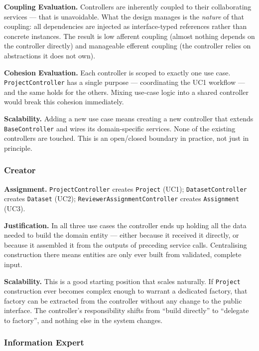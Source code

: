 \documentclass[12pt,a4paper]{article}
\newcommand{\code}[1]{\texttt{\small #1}}
\begin{document}
\noindent\textbf{Coupling Evaluation.}
Controllers are inherently coupled to their collaborating services --- that is unavoidable. What the design manages is the \textit{nature} of that coupling: all dependencies are injected as interface-typed references rather than concrete instances. The result is low afferent coupling (almost nothing depends on the controller directly) and manageable efferent coupling (the controller relies on abstractions it does not own).

\noindent\textbf{Cohesion Evaluation.}
Each controller is scoped to exactly one use case. \code{ProjectController} has a single purpose --- coordinating the UC1 workflow --- and the same holds for the others. Mixing use-case logic into a shared controller would break this cohesion immediately.

\noindent\textbf{Scalability.}
Adding a new use case means creating a new controller that extends \code{BaseController} and wires its domain-specific services. None of the existing controllers are touched. This is an open/closed boundary in practice, not just in principle.

\subsubsection{Creator}

\noindent\textbf{Assignment.}
\code{ProjectController} creates \code{Project} (UC1); \code{DatasetController} creates \code{Dataset} (UC2); \code{ReviewerAssignmentController} creates \code{Assignment} (UC3).

\noindent\textbf{Justification.}
In all three use cases the controller ends up holding all the data needed to build the domain entity --- either because it received it directly, or because it assembled it from the outputs of preceding service calls. Centralising construction there means entities are only ever built from validated, complete input.

\noindent\textbf{Scalability.}
This is a good starting position that scales naturally. If \code{Project} construction ever becomes complex enough to warrant a dedicated factory, that factory can be extracted from the controller without any change to the public interface. The controller's responsibility shifts from ``build directly'' to ``delegate to factory'', and nothing else in the system changes.

\subsubsection{Information Expert}
\end{document}
